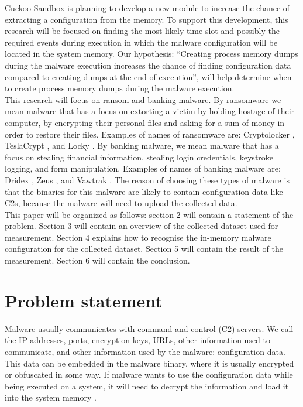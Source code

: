 \documentclass[conference]{IEEEtran}
\begin{document}
Cuckoo Sandbox is planning to develop a new module to increase the chance of extracting a configuration from the memory. To support this development, this research will be focused on finding the most likely time slot and  possibly  the required events during execution in which the malware configuration will be located in the system memory. 
Our hypothesis: “Creating process memory dumps during the malware execution increases the chance of finding \Gls{configuration data} compared to creating dumps at the end of execution”, will help determine when to create process memory dumps during the malware execution.\\

This research will focus on ransom and banking malware. By ransomware we mean malware that has a focus on extorting a victim by holding hostage of their computer, by encrypting their personal files and asking for a sum of money in order to restore their files. Examples of names of ransomware are: Cryptolocker \cite{tran-cryptolocker}, TeslaCrypt \cite{wyke-currans}, and Locky \cite{long-locky}.
By banking malware, we mean malware that has a focus on stealing financial information, stealing login credentials, keystroke logging, and form manipulation. Examples of names of banking malware are: Dridex \cite{brien-dridex}, Zeus \cite{wyke-zeus}, and Vawtrak \cite{kroustek-vawtrak}. The reason of choosing these types of malware is that the binaries  for this malware are likely to contain \Gls{configuration data} like \Gls{C2}s, because the malware will need to upload the collected data.\\

This paper will be organized as follows:  section 2 will contain a statement of the problem. Section 3 will contain an overview of the collected dataset  used for measurement. Section 4 explains how to recognise the in-memory malware configuration for the collected dataset. Section 5 will contain the result of the measurement. Section 6 will contain the conclusion.\\


\section{Problem statement}

Malware usually communicates with command and control (\Gls{C2}) servers. We call the IP addresses, ports, encryption keys, URLs,   other information used to communicate, and other information used by the malware: \Gls{configuration data}. This data can be embedded in the malware binary, where it is usually encrypted or obfuscated in some way. If malware wants to use the \Gls{configuration data} while being executed on a system, it will need to decrypt the information and load it into the system memory \cite{wyke-confextract}.\\
\end{document}
